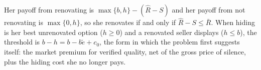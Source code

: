 \noindent Her payoff from renovating is $\max\{b,h\}-(\hat R-S)$ and her payoff from not renovating is $\max\{0,h\}$, so she renovates if and only if $\hat R-S\le\bar R$. When hiding is her best unrenovated option ($h\ge0$) and a renovated seller displays ($h\le b$), the threshold is $b-h=b-b\tilde e+c_0$, the form in which the problem first suggests itself: the market premium for verified quality, net of the gross price of silence, plus the hiding cost she no longer pays.

